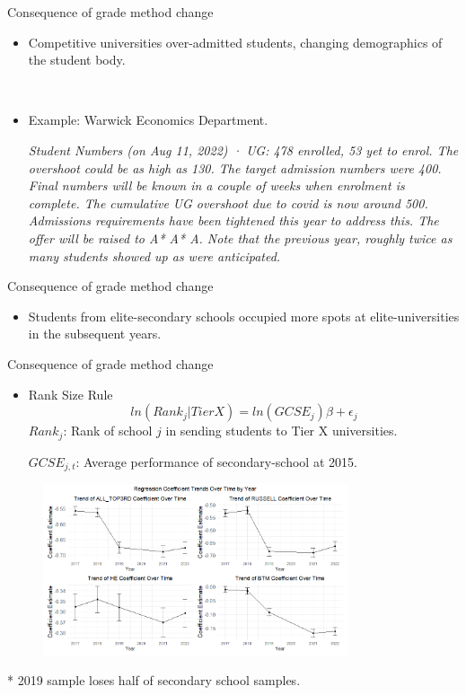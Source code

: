 \begin{frame}{Consequence of grade method change}
    \begin{itemize}
        \item Competitive universities over-admitted students, changing demographics of the student body.

        \

        \item Example: Warwick Economics Department.
        
        \emph{Student Numbers (on Aug 11, 2022) · UG: 478 enrolled, 53 yet to enrol. The overshoot could be as high as 130. The target admission numbers were 400.  Final numbers will be known in a couple of weeks when enrolment is complete. The cumulative UG overshoot due to covid is now around 500. Admissions requirements have been tightened this year to address this. The offer will be raised to A* A* A.  Note that the previous year, roughly twice as many students showed up as were anticipated.}
    \end{itemize}
\end{frame}

\begin{frame}{Consequence of grade method change}
\begin{itemize}
    \item Students from elite-secondary schools occupied more spots at elite-universities in the subsequent years.
\end{itemize}
\end{frame}

\begin{frame}{Consequence of grade method change}
\begin{itemize}
    \item Rank Size Rule
    \begin{equation*}
        ln(Rank_j|TierX) = ln(GCSE_{j})\beta + \epsilon_{j}
    \end{equation*}
    $Rank_{j}$: Rank of school $j$ in sending students to Tier X universities.

    $GCSE_{j,t}$: Average performance of secondary-school at 2015.
\end{itemize}



\begin{figure}
    \centering
    \includegraphics[width=0.8\textwidth]{Background/RankSizeRule.png}
    \label{fig:enter-label}
\end{figure}
* 2019 sample loses half of secondary school samples.
\end{frame}